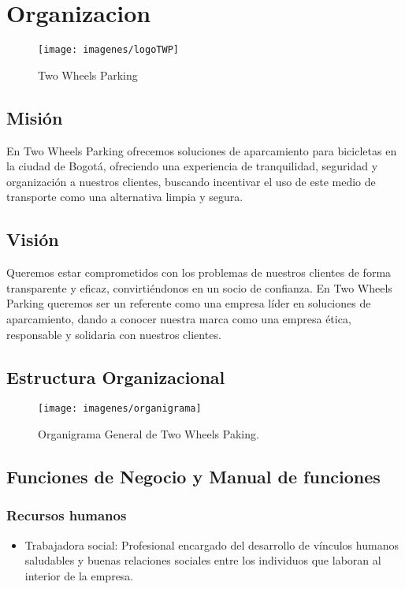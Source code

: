 \chapter{Organizacion}

\begin{figure}[h]
	\centering
	\texttt{[image: imagenes/logoTWP]}
	\caption{Two Wheels Parking}
	\label{fig:logotwp}
\end{figure}


\section{Misión}
En Two Wheels Parking ofrecemos soluciones de aparcamiento para bicicletas en la ciudad de Bogotá, ofreciendo una experiencia de tranquilidad, seguridad y organización a nuestros clientes,  buscando incentivar el uso de este medio de transporte como una alternativa limpia y segura.\\

\section{Visión}
Queremos estar comprometidos con los problemas de nuestros clientes de forma transparente y eficaz, convirtiéndonos en un socio de confianza. En Two Wheels Parking queremos ser un referente como una empresa líder en soluciones de aparcamiento, dando a conocer nuestra marca como una empresa ética, responsable y solidaria con nuestros clientes.\\

\section{Estructura Organizacional}
\begin{figure}[h]
	\centering
	\texttt{[image: imagenes/organigrama]}
	\caption{Organigrama General de Two Wheels Paking.}
	\label{fig:organigrama}
\end{figure}

\section{Funciones de Negocio y Manual de funciones}

\subsection {Recursos humanos}
\begin{itemize}
	\item Trabajadora social: Profesional encargado del desarrollo de vínculos humanos saludables y buenas relaciones sociales entre los individuos que laboran al interior de la empresa.\\
\end{itemize}

